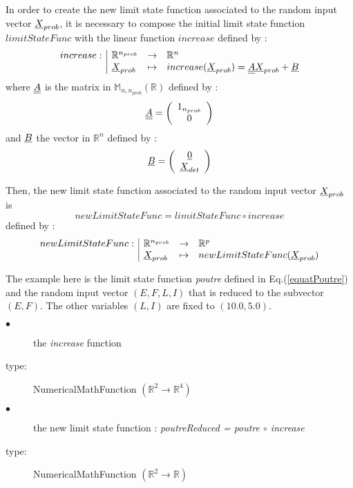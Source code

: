 In order to create the new limit state function associated to the random input vector ${\underline{X}}_{prob}$, it is necessary to compose the initial limit state function $limitStateFunc$ with the linear function $increase$ defined by :
$$
\begin{array}{l|lcl}
  increase : & \mathbb{R}^{n_{prob}}  & \rightarrow & \mathbb{R}^n \\
  & {\underline{X}}_{prob}               & \mapsto     & increase({\underline{X}}_{prob}) = {\underline{\underline{A}}} {\underline{X}}_{prob} + {\underline{B}}
\end{array}
$$
where ${\underline{\underline{A}}}$ is the matrix in $\mathbb{M}_{n, n_{prob}}(\mathbb{R})$ defined by :
$$
{\underline{\underline{A}}}= \left(
  \begin{array}{c}
    1_{n_{prob}}\\
    0
  \end{array}
\right)
$$
and ${\underline{B}}$ the vector in $\mathbb{R}^{n}$ defined by :
$$
{\underline{B}} = \left(
  \begin{array}{c}
    {\underline{0}}  \\
    {\underline{X}}_{det}
  \end{array}
\right)
$$

Then, the new limit state function associated to the random input vector ${\underline{X}}_{prob}$ is $$
newLimitStateFunc = limitStateFunc \circ increase
$$
defined by :
$$
\begin{array}{l|lcl}
  newLimitStateFunc : & \mathbb{R}^{n_{prob}}  & \rightarrow & \mathbb{R}^p \\
  & {\underline{X}}_{prob}                & \mapsto     & newLimitStateFunc({\underline{X}}_{prob})
\end{array}
$$

The example here is the limit state function {\itshape poutre} defined in Eq.(\ref{equatPoutre}) and the random input vector $(E,F,L,I)$ that is reduced to the subvector $(E,F)$. The other variables $(L,I)$ are fixed to $(10.0, 5.0)$.\\

{
  \begin{description}
  \item[$\bullet$] the {\itshape increase} function
  \item[type:] NumericalMathFunction $(\mathbb{R}^2 \rightarrow \mathbb{R}^4)$
  \item[$\bullet$]  the new limit state function : {\itshape poutreReduced = poutre $\circ$ increase}
  \item[type:] NumericalMathFunction $(\mathbb{R}^2 \rightarrow \mathbb{R})$
  \end{description}
}

